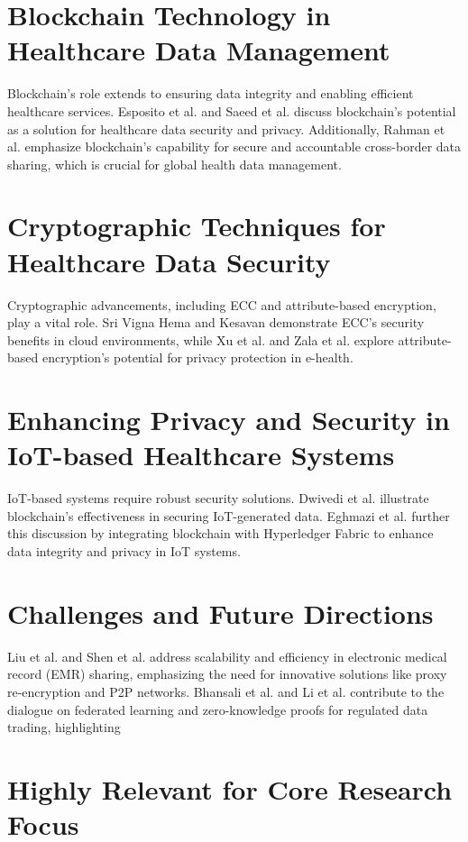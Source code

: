 \documentclass[cic,tc,english]{iiufrgs}
\begin{document}
\section{Blockchain Technology in Healthcare Data Management}
Blockchain's role extends to ensuring data integrity and enabling efficient healthcare services. Esposito et al. \cite{Esposito2018} and Saeed et al. \cite{Saeed2022} discuss blockchain's potential as a solution for healthcare data security and privacy. Additionally, Rahman et al. \cite{Rahman2020} emphasize blockchain's capability for secure and accountable cross-border data sharing, which is crucial for global health data management.

\section{Cryptographic Techniques for Healthcare Data Security}
Cryptographic advancements, including ECC and attribute-based encryption, play a vital role. Sri Vigna Hema and Kesavan \cite{sri2019} demonstrate ECC's security benefits in cloud environments, while Xu et al. \cite{XuJie2019} and Zala et al. \cite{Zala2024} explore attribute-based encryption's potential for privacy protection in e-health.

\section{Enhancing Privacy and Security in IoT-based Healthcare Systems}
IoT-based systems require robust security solutions. Dwivedi et al. \cite{Dwivedi2019} illustrate blockchain's effectiveness in securing IoT-generated data. Eghmazi et al. \cite{Eghmazi2024} further this discussion by integrating blockchain with Hyperledger Fabric to enhance data integrity and privacy in IoT systems.

\section{Challenges and Future Directions}
Liu et al. \cite{Liu2024} and Shen et al. \cite{Shen2019} address scalability and efficiency in electronic medical record (EMR) sharing, emphasizing the need for innovative solutions like proxy re-encryption and P2P networks. Bhansali et al. \cite{Bhansali2022} and Li et al. \cite{Li2024} contribute to the dialogue on federated learning and zero-knowledge proofs for regulated data trading, highlighting 

\section{Highly Relevant for Core Research Focus}
\end{document}
